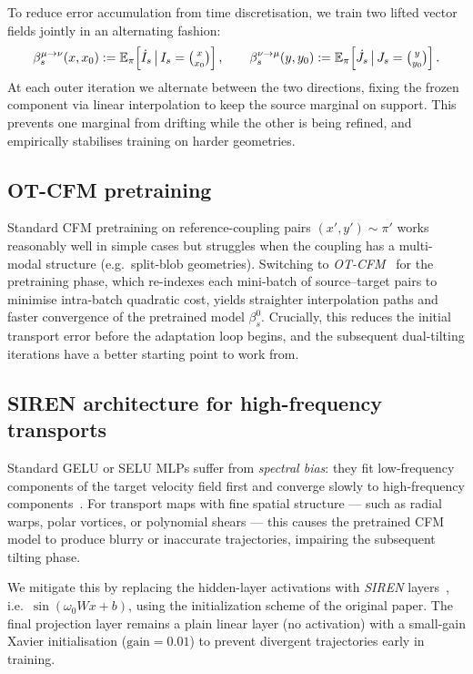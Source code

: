 \documentclass[11pt]{article}
\theoremstyle{definition}
\numberwithin{equation}{section}%
\begin{document}
To reduce error accumulation from time discretisation, we train two lifted
vector fields jointly in an alternating fashion:
\begin{equation*}
\beta_s^{\mu \to \nu}(x, x_0)
:= \mathbb{E}_{\pi}\!\left[\dot{I}_s \,\big|\, I_s = \tbinom{x}{x_0}\right],
\qquad
\beta_s^{\nu \to \mu}(y, y_0)
:= \mathbb{E}_{\pi}\!\left[\dot{J}_s \,\big|\, J_s = \tbinom{y}{y_0}\right].
\end{equation*}
At each outer iteration we alternate between the two directions, fixing the
frozen component via linear interpolation to keep the source marginal on
support. This prevents one marginal from drifting while the other is being
refined, and empirically stabilises training on harder geometries.

\subsection{OT-CFM pretraining}

Standard CFM pretraining on reference-coupling pairs $(x', y') \sim \pi'$
works reasonably well in simple cases but struggles when the coupling has a
multi-modal structure (e.g.\ split-blob geometries). Switching to
\emph{OT-CFM}~\citep{tong2023improving} for the pretraining phase, which
re-indexes each mini-batch of source--target pairs to minimise intra-batch
quadratic cost, yields straighter interpolation paths and faster convergence
of the pretrained model $\beta_s^0$. Crucially, this reduces the initial
transport error before the adaptation loop begins, and the subsequent
dual-tilting iterations have a better starting point to work from.

\subsection{SIREN architecture for high-frequency transports}

Standard GELU or SELU MLPs suffer from \emph{spectral bias}: they fit
low-frequency components of the target velocity field first and converge
slowly to high-frequency components~\citep{rahaman2019spectral}.
For transport maps with fine spatial structure — such as radial warps,
polar vortices, or polynomial shears — this causes the pretrained CFM model
to produce blurry or inaccurate trajectories, impairing the subsequent
tilting phase.

We mitigate this by replacing the hidden-layer activations with
\emph{SIREN} layers~\citep{sitzmann2020implicit}, i.e.\ $\sin(\omega_0
W x + b)$, using the initialization scheme of the original paper.
The final projection layer remains a plain linear layer (no activation)
with a small-gain Xavier initialisation ($\mathrm{gain}=0.01$) to prevent
divergent trajectories early in training.
\end{document}
